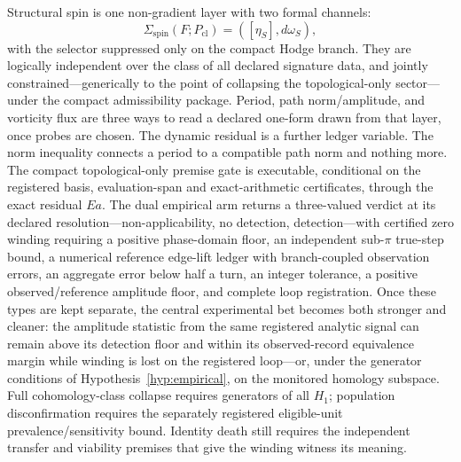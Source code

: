 \documentclass[11pt]{article}
\theoremstyle{definition}
\newcommand{\Sigspin}{\Sigma_{\mathrm{spin}}}
\begin{document}
Structural spin is one non-gradient layer with two formal channels:
\[
\Sigspin(F;P_{\mathrm{cl}})=([\eta_S],d\omega_S),
\]
with the selector suppressed only on the compact Hodge branch.  They are
logically independent over the class of all declared signature data, and
jointly constrained---generically to the point of collapsing the
topological-only sector---under the compact admissibility package.  Period,
path norm/amplitude, and vorticity flux are three ways to read a declared
one-form drawn from that layer, once probes are chosen.  The dynamic
residual is a further ledger variable.  The norm inequality connects a
period to a compatible path norm and nothing more.  The compact
topological-only premise gate is executable, conditional on the registered
basis, evaluation-span and exact-arithmetic certificates, through the exact
residual \(Ea\).  The dual empirical arm returns a three-valued verdict at
its declared resolution---non-applicability, no detection, detection---with
certified zero winding requiring a positive phase-domain floor, an
independent sub-\(\pi\) true-step bound, a numerical reference edge-lift
ledger with branch-coupled observation errors, an aggregate error below half
a turn, an integer tolerance, a positive observed/reference amplitude floor,
and complete loop registration.  Once these types are kept separate, the central
experimental bet becomes both stronger and cleaner: the amplitude statistic
from the same registered analytic signal can remain above its detection floor
and within its observed-record equivalence margin while winding is lost on
the registered loop---or, under the generator conditions of
Hypothesis~\ref{hyp:empirical}, on the monitored homology subspace.  Full
cohomology-class collapse requires generators of all \(H_1\); population
disconfirmation requires the separately registered eligible-unit
prevalence/sensitivity bound.  Identity death still requires the independent
transfer and viability premises that give the winding witness its meaning.
\end{document}
